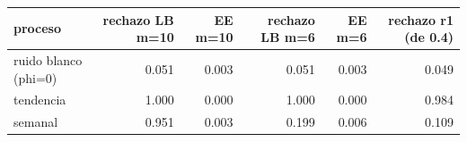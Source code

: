 \begin{tabular}{lrrrrr}
\toprule
proceso & rechazo LB m=10 & EE m=10 & rechazo LB m=6 & EE m=6 & rechazo r1 (de 0.4) \\
\midrule
ruido blanco (phi=0) & 0.051 & 0.003 & 0.051 & 0.003 & 0.049 \\
tendencia & 1.000 & 0.000 & 1.000 & 0.000 & 0.984 \\
semanal & 0.951 & 0.003 & 0.199 & 0.006 & 0.109 \\
\bottomrule
\end{tabular}